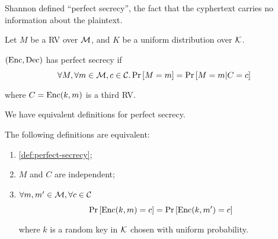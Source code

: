Shannon defined ``perfect secrecy'', \ie the fact that the cyphertext carries no information about the plaintext.
\begin{definition}\label{def:perfect-secrecy}
	Let $M$ be a \ac{RV} over $\mathcal{M}$, and $K$ be a uniform distribution over $\mathcal{K}$.

	$(\mathrm{Enc}, \mathrm{Dec})$ has perfect secrecy if
	\begin{equation*}
		\forall M, \forall m \in \mathcal{M}, c \in \mathcal{C} . \mathop{\mathrm{Pr}}\limits_{} \left[ {M = m} \right] = \mathop{\mathrm{Pr}}\limits_{} \left[ {M = m | C = c} \right]
	\end{equation*}
	where $C = \mathrm{Enc}(k,m)$ is a third \ac{RV}.
\end{definition}

We have equivalent definitions for perfect secrecy.
\begin{theorem}\label{thm:perfect-secrecy:equivalent-definitions}
	The following definitions are equivalent:
	\begin{enumerate}
		\item \label{itm:thm:perfect-secrecy:original} \cref{def:perfect-secrecy};
		\item \label{itm:thm:perfect-secrecy:independent} $M$ and $C$ are independent;
		\item \label{itm:thm:perfect-secrecy:invariant} $\forall m, m' \in \mathcal{M}, \forall c \in \mathcal{C}$
			\begin{equation*}
				\mathop{\mathrm{Pr}}\limits_{} \left[ {\mathrm{Enc}(k,m) = c} \right] = \mathop{\mathrm{Pr}}\limits_{} \left[ {\mathrm{Enc}(k,m') = c} \right]
			\end{equation*}
			where $k$ is a random key in $\mathcal{K}$ chosen with uniform probability. \qedhere
	\end{enumerate}
\end{theorem}


